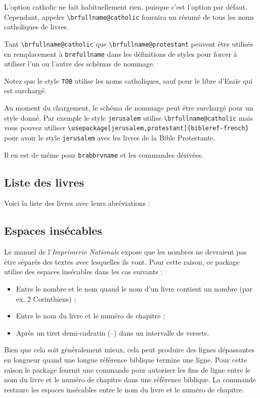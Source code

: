 \documentclass{ltxdoc}
\begin{document}
L'option \textsf{catholic} ne fait habituellement rien, puisque c'est l'option par défaut. Cependant, appeler  \verb!\brfullname@catholic! fournira un résumé de tous les noms catholiques de livres.

Tant \verb|\brfullname@catholic| que \verb|\brfullname@protestant| peuvent être utilisés en remplacement à  \verb|brefullname| dans les définitions de styles pour forcer à utiliser l'un ou l'autre des schémas de nommage.

Notez que le style \verb|TOB| utilise les noms catholiques, sauf pour le libre d'Esaïe qui est surchargé.

Au moment du chargement, le schéma de nommage peut être surchargé pour un style donné. Par exemple le style \verb|jerusalem| utilise \verb|\brfullname@catholic| mais vous pouvez utiliser \verb|\usepackage[jerusalem,protestant]{bibleref-french}| pour avoir le style \verb|jerusalem| avec les livres de la Bible Protestante.

Il en est de même pour \verb|brabbrvname| et les commandes dérivées.

\subsection{Liste des livres}

\def\abreviation{Abréviation}
\def\livre{Livre}
Voici la liste des livres avec leurs abréviations :



\subsection{Espaces insécables}

Le manuel de l'\emph{Imprimerie Nationale} expose que les nombres ne devraient pas être séparés des textes avec lesquelles ils vont. Pour cette raison, ce package utilise des espaces insécables dans les cas suivants :
\begin{itemize}
\item Entre le nombre et le nom quand le nom d'un livre contient un nombre (par ex. 2 Corinthiens) ;
\item Entre le nom du livre et le numéro de chapitre ;
\item Après un tiret demi-cadratin (--) dans un intervalle de versets.

\end{itemize}

Bien que cela soit généralement mieux, cela peut produire des lignes dépassantes en longueur quand une longue référence biblique termine une ligne.
Pour cette raison le package fournit une commande  pour autoriser les fins de ligne entre le nom du livre et le numéro de chapitre dans une référence biblique.
La commande  restaure les espaces insécables entre le nom du livre et le numéro de chapitre.
\end{document}
